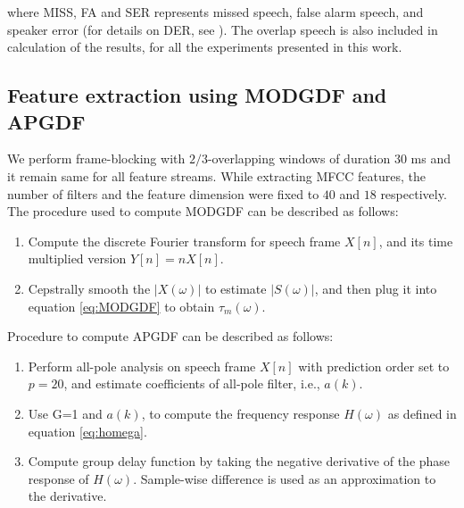 \documentclass[conference]{IEEEtran}
\begin{document}
where MISS, FA and SER represents  missed speech, false alarm speech, and speaker error (for details on DER, see \cite{NIST}). The overlap speech is also included in calculation of the results, for all the experiments presented in this work. 

\subsection{Feature extraction using MODGDF and APGDF}

We perform frame-blocking with $2/3$-overlapping windows of duration 30 ms and it remain same for all feature streams. While extracting MFCC features, the number of filters and the feature dimension were fixed to $40$ and $18$ respectively. The procedure used to compute MODGDF can be described as follows:

\begin{enumerate}
\item Compute the discrete Fourier transform for speech frame $X[n]$, and its time
multiplied version $Y[n]=nX[n]$.
\item Cepstrally smooth the $|X(\omega)|$ to estimate $|S(\omega)|$,
and then plug it into equation \ref{eq:MODGDF} to obtain $\tau_{m}(\omega)$.
\end{enumerate}	

\vspace{0.2cm}
Procedure to compute APGDF can be described as follows:
\begin{enumerate}
\item Perform all-pole analysis on speech frame $X[n]$ with prediction order set to
$p=20$, and estimate coefficients of all-pole filter, i.e., $a(k)$.  
\item Use G=1 and $a(k)$, to compute the frequency response $H(\omega)$ as defined
in equation \ref{eq:homega}.
\item Compute group delay function by taking the negative derivative of
the phase response of $H(\omega)$. Sample-wise
difference is used as an approximation to the derivative.
\end{enumerate}	
\vspace{0.2cm}
\end{document}
